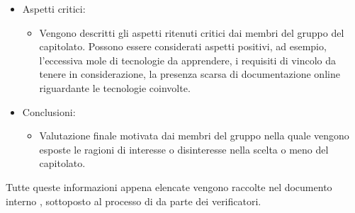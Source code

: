 \begin{itemize}
\item Aspetti critici:
	\begin{itemize}
	\item Vengono descritti gli aspetti ritenuti critici dai membri del gruppo \Gruppo{} del capitolato.
	Possono essere considerati aspetti positivi, ad esempio, l'eccessiva mole di tecnologie da apprendere, i requisiti di vincolo da tenere in considerazione, la presenza scarsa di documentazione online riguardante le tecnologie coinvolte.
	\end{itemize}
\item Conclusioni:
	\begin{itemize}
	\item Valutazione finale motivata dai membri del gruppo \Gruppo{} nella quale vengono esposte le ragioni di interesse o disinteresse nella scelta o meno del capitolato.
	\end{itemize}
\end{itemize}
Tutte queste informazioni appena elencate vengono raccolte nel documento interno \glo{\SdF{}}, sottoposto al processo di  da parte dei verificatori.

